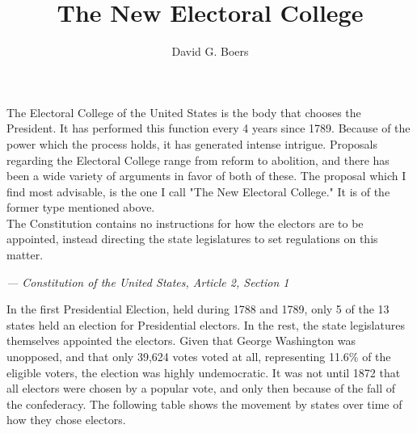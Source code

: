 \documentclass{article}
\title{The New Electoral College}
\author{David G. Boers}
\begin{document}
    \maketitle
    The Electoral College of the United States is the body that chooses the President. It has performed this function every 4 years since 1789. Because of the power which the process holds, it has generated intense intrigue. Proposals regarding the Electoral College range from reform to abolition, and there has been a wide variety of arguments in favor of both of these. The proposal which I find most advisable, is the one I call "The New Electoral College." It is of the former type mentioned above.\\
    
    The Constitution contains no instructions for how the electors are to be appointed, instead directing the state legislatures to set regulations on this matter.\\

    \begin{flushright}\textit{--- Constitution of the United States, Article 2, Section 1}\end{flushright}%

    In the first Presidential Election, held during 1788 and 1789, only 5 of the 13 states held an election for Presidential electors. In the rest, the state legislatures themselves appointed the electors. Given that George Washington was unopposed, and that only 39,624 votes voted at all, representing 11.6\% of the eligible voters, the election was highly undemocratic. It was not until 1872 that all electors were chosen by a popular vote, and only then because of the fall of the confederacy. The following table shows the movement by states over time of how they chose electors.\\
\end{document}
